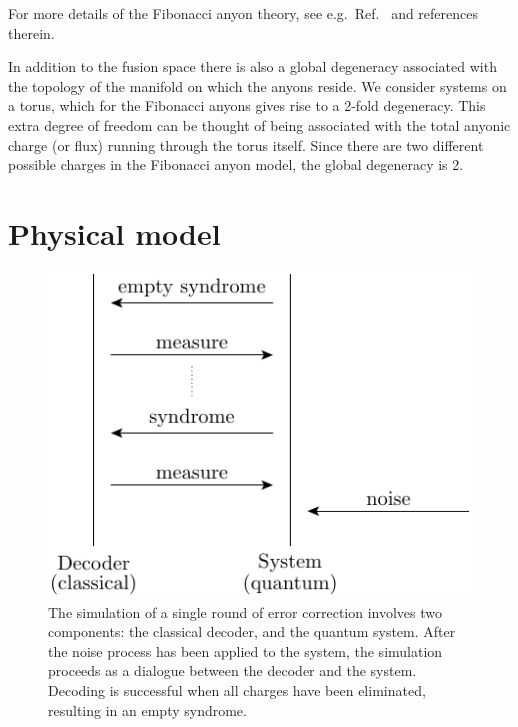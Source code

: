 For more details of the Fibonacci anyon
theory, see e.g.\ Ref.~\cite{Nayak2008} and references therein.

In addition to the fusion space there is also a
global degeneracy associated with the topology of the
manifold on which the anyons reside.
We consider systems on a torus,
which for the Fibonacci anyons gives rise to a 2-fold degeneracy.
This extra degree of freedom can be thought of being
associated with the total anyonic charge (or flux) running through
the torus itself. Since there are two different possible charges
in the Fibonacci anyon model, the global degeneracy is 2.


%
%

\section{Physical model}

\begin{figure}
\begin{center}
\includegraphics[]{pic-process.pdf}
\end{center}
\caption{
The simulation of a single round of
error correction involves two components: 
the classical decoder, and the quantum system.
After the noise process has been applied to the
system, the simulation proceeds as a dialogue between
the decoder and the system. 
Decoding is successful when all charges have been eliminated,
resulting in an empty syndrome.
}
\label{PicProcess}
\end{figure}



